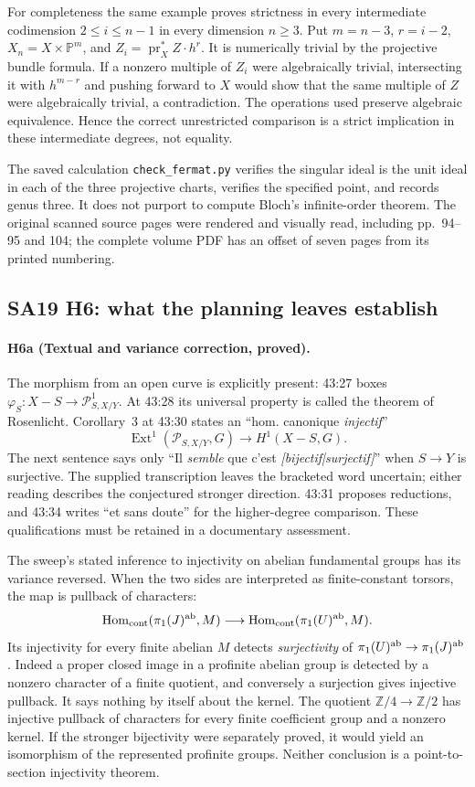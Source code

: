 For completeness the same example proves strictness in every
intermediate codimension $2\leq i\leq n-1$ in every dimension
$n\geq3$.  Put $m=n-3$, $r=i-2$, $X_n=X\times\mathbb P^m$,
and $Z_i=\operatorname{pr}_X^*Z\cdot h^r$.  It is numerically
trivial by the projective bundle formula.  If a nonzero multiple
of $Z_i$ were algebraically trivial, intersecting it with
$h^{m-r}$ and pushing forward to $X$ would show that the same
multiple of $Z$ were algebraically trivial, a contradiction.
The operations used preserve algebraic equivalence.  Hence the
correct unrestricted comparison is a strict implication in
these intermediate degrees, not equality.

The saved calculation \texttt{check\_fermat.py} verifies the
singular ideal is the unit ideal in each of the three projective
charts, verifies the specified point, and records genus three.
It does not purport to compute Bloch's infinite-order theorem.
The original scanned source pages were rendered and visually
read, including pp.~94--95 and 104; the complete volume PDF
has an offset of seven pages from its printed numbering.


\subsection{SA19 H6: what the planning leaves establish}
\paragraph{H6a (Textual and variance correction, proved).}
The morphism from an open curve is explicitly present:
43:27 boxes $\varphi_S:X-S\to\mathscr P^1_{S,X/Y}$.
At 43:28 its universal property is called the theorem of
Rosenlicht.  Corollary~3 at 43:30 states an ``hom. canonique
\emph{injectif}''
\[
 \operatorname{Ext}^1(\mathscr P_{S,X/Y},G)
        \longrightarrow H^1(X-S,G).
\]
The next sentence says only ``Il \emph{semble} que c'est
\emph{[bijectif|surjectif]}'' when $S\to Y$ is surjective.
The supplied transcription leaves the bracketed word uncertain;
either reading describes the conjectured stronger direction.
43:31 proposes reductions, and 43:34 writes ``et sans doute''
for the higher-degree comparison.  These qualifications must be
retained in a documentary assessment.

The sweep's stated inference to injectivity on abelian
fundamental groups has its variance reversed.  When the two
sides are interpreted as finite-constant torsors, the map is
pullback of characters:
\[
 \operatorname{Hom}_{\rm cont}(\pi_1(J)^{\rm ab},M)
 \longrightarrow
 \operatorname{Hom}_{\rm cont}(\pi_1(U)^{\rm ab},M).
\]
Its injectivity for every finite abelian $M$ detects
\emph{surjectivity} of $\pi_1(U)^{\rm ab}\to\pi_1(J)^{\rm ab}$.
Indeed a proper closed image in a profinite abelian group is
detected by a nonzero character of a finite quotient, and
conversely a surjection gives injective pullback.  It says
nothing by itself about the kernel.  The quotient
$\mathbb Z/4\to\mathbb Z/2$ has injective pullback of characters
for every finite coefficient group and a nonzero kernel.
If the stronger bijectivity were separately proved, it would
yield an isomorphism of the represented profinite groups.
Neither conclusion is a point-to-section injectivity theorem.

